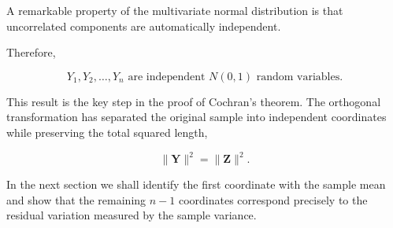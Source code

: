 \documentclass[11pt]{article}
\begin{document}
\begin{mdframed}[
		linewidth=0.8pt,
		roundcorner=6pt,
		backgroundcolor=gray!5,
		linecolor=gray!60,
		innertopmargin=10pt,
		innerbottommargin=10pt,
		innerleftmargin=10pt,
		innerrightmargin=10pt
		]
		A remarkable property of the multivariate normal distribution is that
		uncorrelated components are automatically independent.
		
		Therefore,
		
		\[
		\boxed{
			Y_1,Y_2,\ldots,Y_n
			\text{ are independent }
			N(0,1)
			\text{ random variables.}
		}
		\]
		
		This result is the key step in the proof of Cochran's theorem.
		The orthogonal transformation has separated the original sample into
		independent coordinates while preserving the total squared length,
		
		\[
		\|\mathbf Y\|^2
		=
		\|\mathbf Z\|^2.
		\]
		
		In the next section we shall identify the first coordinate with the
		sample mean and show that the remaining $n-1$ coordinates correspond
		precisely to the residual variation measured by the sample variance.
		
	\end{mdframed}
	
\end{document}
